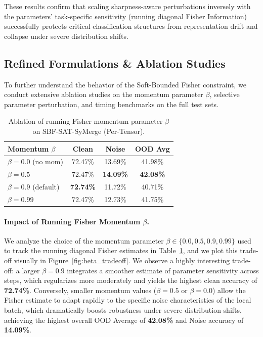\documentclass{article}
\theoremstyle{plain}
\theoremstyle{definition}
\theoremstyle{remark}
\begin{document}
These results confirm that scaling sharpness-aware perturbations inversely with the parameters' task-specific sensitivity (running diagonal Fisher Information) successfully protects critical classification structures from representation drift and collapse under severe distribution shifts.

\subsection{Refined Formulations \& Ablation Studies}
To further understand the behavior of the Soft-Bounded Fisher constraint, we conduct extensive ablation studies on the momentum parameter $\beta$, selective parameter perturbation, and timing benchmarks on the full test sets.

\begin{table}[t]
\caption{Ablation of running Fisher momentum parameter $\beta$ on SBF-SAT-SyMerge (Per-Tensor).}
\label{tab:beta_ablation}
\vskip 0.15in
\begin{center}
\begin{small}
\begin{sc}
\begin{tabular}{lccc}
\toprule
Momentum $\beta$ & Clean & Noise & OOD Avg \\
\midrule
$\beta = 0.0$ (no mom) & 72.47\% & 13.69\% & 41.98\% \\
$\beta = 0.5$ & 72.47\% & \textbf{14.09\%} & \textbf{42.08\%} \\
$\beta = 0.9$ (default) & \textbf{72.74\%} & 11.72\% & 40.71\% \\
$\beta = 0.99$ & 72.47\% & 12.73\% & 41.75\% \\
\bottomrule
\end{tabular}
\end{sc}
\end{small}
\end{center}
\vskip -0.1in
\end{table}

\paragraph{Impact of Running Fisher Momentum $\beta$.}
We analyze the choice of the momentum parameter $\beta \in \{0.0, 0.5, 0.9, 0.99\}$ used to track the running diagonal Fisher estimates in Table~\ref{tab:beta_ablation}, and we plot this trade-off visually in Figure~\ref{fig:beta_tradeoff}. 
We observe a highly interesting trade-off: a larger $\beta = 0.9$ integrates a smoother estimate of parameter sensitivity across steps, which regularizes more moderately and yields the highest clean accuracy of \textbf{72.74\%}. 
Conversely, smaller momentum values ($\beta=0.5$ or $\beta=0.0$) allow the Fisher estimate to adapt rapidly to the specific noise characteristics of the local batch, which dramatically boosts robustness under severe distribution shifts, achieving the highest overall OOD Average of \textbf{42.08\%} and Noise accuracy of \textbf{14.09\%}.
\end{document}
